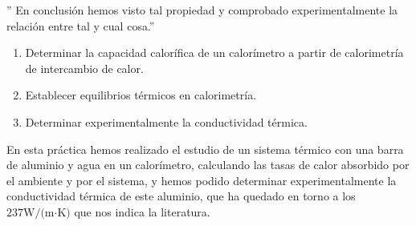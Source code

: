 \documentclass[a4paper,12pt,spanish]{article}
\begin{document}
	'' En conclusión hemos visto tal propiedad y comprobado experimentalmente la relación entre tal y cual cosa.''
	
	
	
	\begin{enumerate}
		\item Determinar la capacidad calorífica de un calorímetro a partir de calorimetría de intercambio de calor.
		\item Establecer equilibrios térmicos en calorimetría.
		\item Determinar experimentalmente la conductividad térmica.
	\end{enumerate}
	\fi	
	
	
	En esta práctica hemos realizado el estudio de un sistema térmico con una barra de aluminio y agua en un calorímetro, calculando las tasas de calor absorbido por el ambiente y por el sistema, y hemos podido determinar experimentalmente la conductividad térmica de este aluminio, que ha quedado en torno a los  $237 \text{W/(m·K)}$ que nos indica la literatura.
	
	
	\iffalse
	
	\begin{thebibliography}{3}
		
		
		
		
		\bibitem{UNED2022} (varios) Guiones de prácticas- Técnicas Experimentales II. Grado en Física. Versión 2.1  UNED, 2022 \url{https://2022.cursosvirtuales.uned.es/o/3754218}
		
		
		\bibitem{UNED2021} (varios) Técnicas Experimentales I. Versión 3.5.  UNED, 2021 \url{https://2021.cursosvirtuales.uned.es/o/42035617}
		
		
		
	\end{thebibliography}
	\fi
	
	
	
	
	
\end{document}
